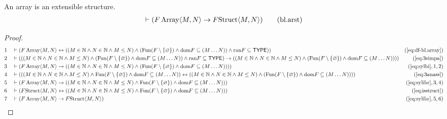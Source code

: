 \begin{lemma} An array is an extensible structure.
\begin{align}
\vdash ( F \,\mathrm{Array} \langle M , N \rangle \rightarrow F {\rm Struct}
    \langle M , N \rangle )\label{eq:bl.arst}\tag{bl.arst}
\end{align}
\end{lemma}

\begin{proof}
\begin{align}
  1 &&  & \vdash ( F \,\mathrm{Array} \langle M , N \rangle \leftrightarrow ( ( M \in \mathbb{N} \wedge N \in \mathbb{N} \wedge M \le N ) \wedge ( {\rm Fun} ( F \setminus \{ \varnothing \} ) \wedge {\rm dom} F \subseteq ( M \ldots N ) ) \wedge {\rm ran} F \subseteq \mathsf{TYPE} ) )&(\mbox{\ref{eq:df-bl.array}})\notag
  \\ 2 &&  & \vdash ( ( ( M \in \mathbb{N} \wedge N \in \mathbb{N} \wedge M \le N ) \wedge ( {\rm Fun} ( F \setminus \{ \varnothing \} ) \wedge {\rm dom} F \subseteq ( M \ldots N ) ) \wedge {\rm ran} F \subseteq \mathsf{TYPE} ) \rightarrow ( ( M \in \mathbb{N} \wedge N \in \mathbb{N} \wedge M \le N ) \wedge ( {\rm Fun} ( F \setminus \{ \varnothing \} ) \wedge {\rm dom} F \subseteq ( M \ldots N ) ) ) )&(\mbox{\ref{eq:3simpa}})\notag
  \\ 3 &&  & \vdash ( F \,\mathrm{Array} \langle M , N \rangle \rightarrow ( ( M \in \mathbb{N} \wedge N \in \mathbb{N} \wedge M \le N ) \wedge ( {\rm Fun} ( F \setminus \{ \varnothing \} ) \wedge {\rm dom} F \subseteq ( M \ldots N ) ) ) )&(\mbox{\ref{eq:sylbi}},1,2)\notag
  \\ 4 &&  & \vdash ( ( ( M \in \mathbb{N} \wedge N \in \mathbb{N} \wedge M \le N ) \wedge {\rm Fun} ( F \setminus \{ \varnothing \} ) \wedge {\rm dom} F \subseteq ( M \ldots N ) ) \leftrightarrow ( ( M \in \mathbb{N} \wedge N \in \mathbb{N} \wedge M \le N ) \wedge ( {\rm Fun} ( F \setminus \{ \varnothing \} ) \wedge {\rm dom} F \subseteq ( M \ldots N ) ) ) )&(\mbox{\ref{eq:3anass}})\notag
  \\ 5 &&  & \vdash ( F \,\mathrm{Array} \langle M , N \rangle \rightarrow ( ( M \in \mathbb{N} \wedge N \in \mathbb{N} \wedge M \le N ) \wedge {\rm Fun} ( F \setminus \{ \varnothing \} ) \wedge {\rm dom} F \subseteq ( M \ldots N ) ) )&(\mbox{\ref{eq:sylibr}},3,4)\notag
  \\ 6 &&  & \vdash ( F {\rm Struct} \langle M , N \rangle \leftrightarrow ( ( M \in \mathbb{N} \wedge N \in \mathbb{N} \wedge M \le N ) \wedge {\rm Fun} ( F \setminus \{ \varnothing \} ) \wedge {\rm dom} F \subseteq ( M \ldots N ) ) )&(\mbox{\ref{eq:isstruct}})\notag
  \\ 7 &&  & \vdash ( F \,\mathrm{Array} \langle M , N \rangle \rightarrow F {\rm Struct} \langle M , N \rangle )&(\mbox{\ref{eq:sylibr}},5,6)\notag
\end{align}
\end{proof}

